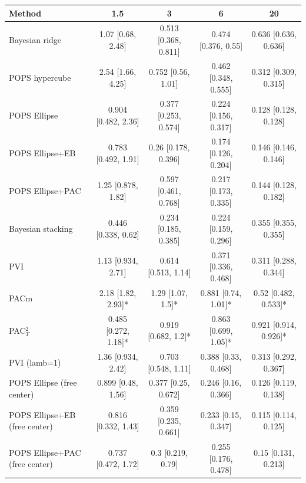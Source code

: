 \begin{tabular}{lcccc}
\toprule
Method & 1.5 & 3 & 6 & 20 \\
\midrule
Bayesian ridge & 1.07 {\scriptsize[0.68, 2.48]} & 0.513 {\scriptsize[0.368, 0.811]} & 0.474 {\scriptsize[0.376, 0.55]} & 0.636 {\scriptsize[0.636, 0.636]} \\
POPS hypercube & 2.54 {\scriptsize[1.66, 4.25]} & 0.752 {\scriptsize[0.56, 1.01]} & 0.462 {\scriptsize[0.348, 0.555]} & 0.312 {\scriptsize[0.309, 0.315]} \\
POPS Ellipse & 0.904 {\scriptsize[0.482, 2.36]} & 0.377 {\scriptsize[0.253, 0.574]} & 0.224 {\scriptsize[0.156, 0.317]} & 0.128 {\scriptsize[0.128, 0.128]} \\
POPS Ellipse+EB & 0.783 {\scriptsize[0.492, 1.91]} & 0.26 {\scriptsize[0.178, 0.396]} & 0.174 {\scriptsize[0.126, 0.204]} & 0.146 {\scriptsize[0.146, 0.146]} \\
POPS Ellipse+PAC & 1.25 {\scriptsize[0.878, 1.82]} & 0.597 {\scriptsize[0.461, 0.768]} & 0.217 {\scriptsize[0.173, 0.335]} & 0.144 {\scriptsize[0.128, 0.182]} \\
Bayesian stacking & 0.446 {\scriptsize[0.338, 0.62]} & 0.234 {\scriptsize[0.185, 0.385]} & 0.224 {\scriptsize[0.159, 0.296]} & 0.355 {\scriptsize[0.355, 0.355]} \\
PVI & 1.13 {\scriptsize[0.934, 2.71]} & 0.614 {\scriptsize[0.513, 1.14]} & 0.371 {\scriptsize[0.336, 0.468]} & 0.311 {\scriptsize[0.288, 0.344]} \\
PACm & 2.18 {\scriptsize[1.82, 2.93]}* & 1.29 {\scriptsize[1.07, 1.5]}* & 0.881 {\scriptsize[0.74, 1.01]}* & 0.52 {\scriptsize[0.482, 0.533]}* \\
PAC$^2_T$ & 0.485 {\scriptsize[0.272, 1.18]}* & 0.919 {\scriptsize[0.682, 1.2]}* & 0.863 {\scriptsize[0.699, 1.05]}* & 0.921 {\scriptsize[0.914, 0.926]}* \\
PVI (lamb=1) & 1.36 {\scriptsize[0.934, 2.42]} & 0.703 {\scriptsize[0.548, 1.11]} & 0.388 {\scriptsize[0.33, 0.468]} & 0.313 {\scriptsize[0.292, 0.367]} \\
POPS Ellipse (free center) & 0.899 {\scriptsize[0.48, 1.56]} & 0.377 {\scriptsize[0.25, 0.672]} & 0.246 {\scriptsize[0.16, 0.366]} & 0.126 {\scriptsize[0.119, 0.138]} \\
POPS Ellipse+EB (free center) & 0.816 {\scriptsize[0.332, 1.43]} & 0.359 {\scriptsize[0.235, 0.661]} & 0.233 {\scriptsize[0.15, 0.347]} & 0.115 {\scriptsize[0.114, 0.125]} \\
POPS Ellipse+PAC (free center) & 0.737 {\scriptsize[0.472, 1.72]} & 0.3 {\scriptsize[0.219, 0.79]} & 0.255 {\scriptsize[0.176, 0.478]} & 0.15 {\scriptsize[0.131, 0.213]} \\
\bottomrule
\end{tabular}

